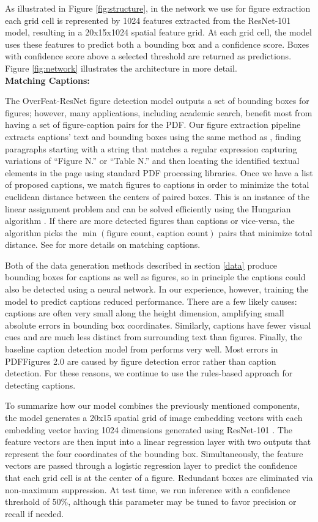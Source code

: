 \documentclass[sigconf]{acmart}
\begin{document}
As illustrated in Figure \ref{fig:structure}, in the network we use for figure extraction each grid cell is represented by 1024 features extracted from the ResNet-101 model, resulting in a 20x15x1024 spatial feature grid. 
At each grid cell, the model uses these features to predict both a bounding box and a confidence score. Boxes with confidence score above a selected threshold are returned as predictions. Figure \ref{fig:network} illustrates the architecture in more detail.
\\[15pt]\textbf{Matching Captions:}

The OverFeat-ResNet figure detection model outputs a set of bounding boxes for figures; however, many applications, including academic search, benefit most from having a set of figure-caption pairs for the PDF. Our figure extraction pipeline extracts captions' text and bounding boxes using the same method as \cite{pdffigures2}, finding paragraphs starting with a string that matches a regular expression capturing variations of ``Figure N.'' or ``Table N.'' and then locating the identified textual elements in the page using standard PDF processing libraries. 
Once we have a list of proposed captions, we match figures to captions in order to minimize the total euclidean distance between the centers of paired boxes. 
This is an instance of the linear assignment problem and can be solved efficiently using the Hungarian algorithm \cite{kuhn1955hungarian}. 
If there are more detected figures than captions or vice-versa, the algorithm picks the $\min(\text{figure count, caption count})$ pairs that minimize total distance.
See \cite{pdffigures2} for more details on matching captions. 

Both of the data generation methods described in section \ref{data} produce bounding boxes for captions as well as figures, so in principle the captions could also be detected using a neural network. In our experience, however, training the model to predict captions reduced performance. There are a few likely causes: captions are often very small along the height dimension, amplifying small absolute errors in bounding box coordinates. Similarly, captions have fewer visual cues and are much less distinct from surrounding text than figures. Finally, the baseline caption detection model from \cite{pdffigures} performs very well. Most errors in PDFFigures 2.0 are caused by figure detection error rather than caption detection. For these reasons, we continue to use the rules-based approach for detecting captions. 

To summarize how our model combines the previously mentioned components, the model generates a 20x15 spatial grid of image embedding vectors with each embedding vector having 1024 dimensions generated using ResNet-101 \cite{resnet}.
The feature vectors are then input into a linear regression layer with two outputs that represent the four coordinates of the bounding box. Simultaneously, the feature vectors are passed through a logistic regression layer to predict the confidence that each grid cell is at the center of a figure. Redundant boxes are eliminated via non-maximum suppression. At test time, we run inference with a confidence threshold of 50\%, although this parameter may be tuned to favor precision or recall if needed.
\end{document}
